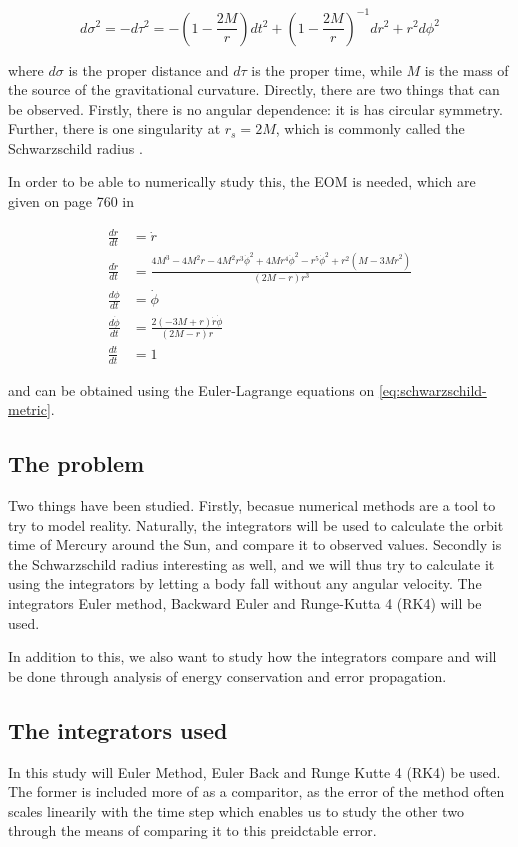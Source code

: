 \begin{equation}\label{eq:schwarzschild-metric}
	d\sigma^2 = -d\tau^2 = - \left( 1 - \frac{2M}{r}\right)dt^2 + \left(1 - \frac{2M}{r}\right)^{-1} dr^2 + r^2 d\phi^2
\end{equation}

where $d\sigma$ is the proper distance and $d\tau$ is the proper time, while $M$ is the mass of the source of the gravitational curvature. Directly, there are two things that can be observed. Firstly, there is no angular dependence: it is has circular symmetry. Further, there is one singularity at $r_s = 2M$, which is commonly called the Schwarzschild radius \cite{guidry_2019}. 

In order to be able to numerically study this, the EOM is needed, which are given on page 760 in \cite{gould_2007}

\begin{align}\label{eq:eoms}
      		\frac{dr}{dt} &= \dot{r} \\
	\frac{d\dot{r}}{dt} &= \frac{4 M^3-4 M^2 r-4 M^2 r^3 \dot{\phi}^2+4 M r^4 \dot{\phi}^2-r^5 \dot{\phi}^2+r^2\left(M-3 M \dot{r}^2\right)}{(2 M-r) r^3} \\
	\frac{d\phi}{dt} &= \dot{\phi} \\
	\frac{d\dot{\phi}}{dt} &= \frac{2(-3M + r)\dot{r}\dot{\phi}}{(2M - r)r} \\
	\frac{dt}{dt} &= 1
\end{align}

and can be obtained using the Euler-Lagrange equations on \eqref{eq:schwarzschild-metric}. 

\subsection{The problem}
Two things have been studied. Firstly, becasue numerical methods are a tool to try to model reality. Naturally, the integrators will be used to calculate the orbit time of Mercury around the Sun, and compare it to observed values. Secondly is the Schwarzschild radius interesting as well, and we will thus try to calculate it using the integrators by letting a body fall without any angular velocity. The integrators Euler method, Backward Euler and Runge-Kutta 4 (RK4) will be used. 

In addition to this, we also want to study how the integrators compare and will be done through analysis of energy conservation and error propagation.


\subsection{The integrators used}
In this study will Euler Method, Euler Back and Runge Kutte 4 (RK4) be used. The former is included more of as a comparitor, as the error of the method often scales linearily with the time step which enables us to study the other two through the means of comparing it to this preidctable error. 

